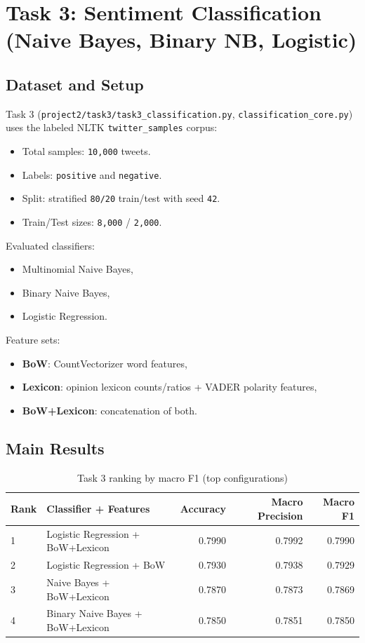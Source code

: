 \documentclass[10pt,a4paper]{article}
\begin{document}
\section{Task 3: Sentiment Classification (Naive Bayes, Binary NB, Logistic)}

\subsection{Dataset and Setup}
Task 3 (\texttt{project2/task3/task3\_classification.py}, \texttt{classification\_core.py}) uses the labeled NLTK \texttt{twitter\_samples} corpus:
\begin{itemize}
    \item Total samples: \texttt{10,000} tweets.
    \item Labels: \texttt{positive} and \texttt{negative}.
    \item Split: stratified \texttt{80/20} train/test with seed \texttt{42}.
    \item Train/Test sizes: \texttt{8,000} / \texttt{2,000}.
\end{itemize}

Evaluated classifiers:
\begin{itemize}
    \item Multinomial Naive Bayes,
    \item Binary Naive Bayes,
    \item Logistic Regression.
\end{itemize}

Feature sets:
\begin{itemize}
    \item \textbf{BoW}: CountVectorizer word features,
    \item \textbf{Lexicon}: opinion lexicon counts/ratios + VADER polarity features,
    \item \textbf{BoW+Lexicon}: concatenation of both.
\end{itemize}

\subsection{Main Results}
\begin{table}[H]
\centering
\caption{Task 3 ranking by macro F1 (top configurations)}
\label{tab:task3-summary}
\begin{tabular}{llrrr}
\toprule
\textbf{Rank} & \textbf{Classifier + Features} & \textbf{Accuracy} & \textbf{Macro Precision} & \textbf{Macro F1} \\
\midrule
1 & Logistic Regression + BoW+Lexicon & 0.7990 & 0.7992 & 0.7990 \\
2 & Logistic Regression + BoW & 0.7930 & 0.7938 & 0.7929 \\
3 & Naive Bayes + BoW+Lexicon & 0.7870 & 0.7873 & 0.7869 \\
4 & Binary Naive Bayes + BoW+Lexicon & 0.7850 & 0.7851 & 0.7850 \\
\bottomrule
\end{tabular}
\end{table}
\end{document}
